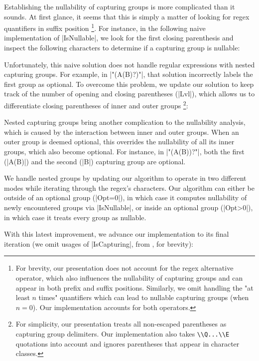 Establishing the nullability of capturing groups is more complicated than it sounds.
At first glance, it seems that this is simply a matter of looking for regex quantifiers in suffix position%
\footnote{
For brevity, our presentation does not account for the regex alternative operator, which also influences the nullability of capturing groups and can appear in both prefix and suffix positions.
Similarly, we omit handling the "at least $n$ times" quantifiers which can lead to nullable capturing groups (when $n=0$).
Our implementation accounts for both operators.
}.
For instance, in the following naive implementation of |IsNullable|, we look for the first closing parenthesis and inspect the following characters to determine if a capturing group is nullable:

\regexNaiveIsNullable

\noindent
Unfortunately, this naive solution does not handle regular expressions with nested capturing groups.
For example, in |"(A(B)?)"|, that solution incorrectly labels the first group as optional.
To overcome this problem, we update our solution to keep track of the number of opening and closing parentheses (|Lvl|), which allows us to differentiate closing parentheses of inner and outer groups%
\footnote{
For simplicity, our presentation treats all non-escaped parentheses as capturing group delimiters.
Our implementation also takes \lstinline!\\Q...\\E! quotations into account and ignores parentheses that appear in character classes.
}:

\regexIsNullable

Nested capturing groups bring another complication to the nullability analysis, which is caused by the interaction between inner and outer groups.
When an outer group is deemed optional, this overrides the nullability of all its inner groups, which also become optional.
For instance, in |"(A(B))?"|, both the first (|A(B)|) and the second (|B|) capturing group are optional.

We handle nested groups by updating our algorithm to operate in two different modes while iterating through the regex's characters.
Our algorithm can either be outside of an optional group (|Opt=0|), in which case it computes nullability of newly encountered groups via |IsNullable|, or inside an optional group (|Opt>0|), in which case it treats every group as nullable.

With this latest improvement, we advance our implementation to its final iteration (we omit usages of |IsCapturing|, from , for brevity):

